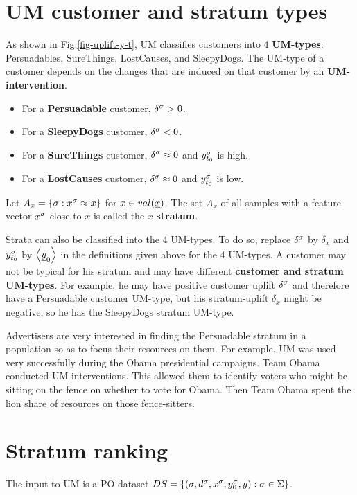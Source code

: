\section{UM customer and stratum types}
\label{sec-up-types}
As shown
in Fig.\ref{fig-uplift-y-t},
UM classifies customers
into 4 {\bf UM-types}: Persuadables, SureThings, LostCauses,
and SleepyDogs.
The UM-type
of a customer
depends on the changes 
that are induced on that customer
by an {\bf UM-intervention}.
\begin{itemize}
\item
For a {\bf Persuadable} customer,
$\delta^\sigma>0$.
\item
For a {\bf SleepyDogs}
customer, $\delta^\sigma< 0$.
\item
For a {\bf SureThings} customer,
 $\delta^\sigma\approx 0$
and $y^\sigma_{t_0}$ is high.
\item
For a {\bf LostCauses} customer,
$\delta^\sigma\approx 0$
and $y^\sigma_{t_0}$ is low.
\end{itemize}

Let $A_x = \{\sigma: x^\sigma \approx x\}$ for  $x\in val(\rvx)$.
The set $A_x$ of all samples with
a feature vector $x^\sigma$ close to $x$ 
is called the $x$ {\bf stratum}.

Strata can also be
classified into
the 4 UM-types. To do
so, replace $\delta^\sigma$ by $\delta_x$
and $y^\sigma_{t_0}$ by $\av{\rvy_0}$
in the definitions given above for the 4 UM-types.
A customer 
may not be typical for
his stratum
and may
have different
{\bf customer and stratum UM-types}.
For example, he may have positive 
customer uplift $\delta^\sigma$
and therefore have a Persuadable customer UM-type,
but his stratum-uplift  $\delta_x$
might be negative, so
he has
the SleepyDogs stratum UM-type.

Advertisers are very interested in finding
the Persuadable stratum in a population
so as to focus their resources on them.
For example, UM was used very
successfully during the 
Obama presidential campaigns. 
Team Obama conducted UM-interventions.
This allowed them to
identify voters who might be sitting on the fence
on whether to vote for Obama.
Then Team Obama spent
the lion share
of  resources  on those
fence-sitters.



\section{Stratum ranking}
\label{sec-up-ranking}

The input
to UM is a PO
dataset $DS= \{ (\sigma, d^\sigma, x^\sigma, y^\sigma_0, y):
 \sigma\in\Sigma\}$.
 
